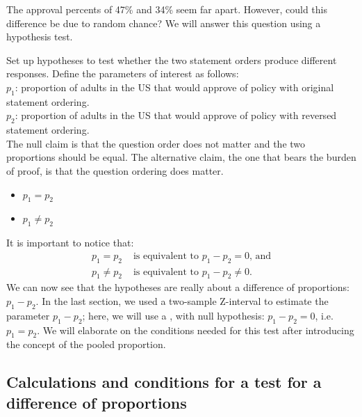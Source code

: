\D{\newpage}

\noindent The approval percents of 47\% and 34\% seem far apart.  However, could this difference be due to random chance?  We will answer this question using a hypothesis test.  

\begin{examplewrap}
\begin{nexample}{Set up hypotheses to test whether the two statement orders produce different responses. }
Define the parameters of interest as follows:\\
$p_1 $: proportion of adults in the US that would approve of policy with original statement ordering.\\
$p_2$: proportion of adults in the US that would approve of policy with reversed statement ordering.\\

The null claim is that the question order does not matter and the two proportions should be equal. The alternative claim, the one that bears the burden of proof, is that the question ordering does matter.  
\begin{itemize}
\setlength{\itemsep}{0mm}
\item[$H_0$:] $p_1 =  p_2$ 
\item[$H_A$:] $p_1 \ne  p_2$
\end{itemize}
\end{nexample}
\end{examplewrap}

\noindent%
It is important to notice that:
\vspace{-2mm}
\begin{align*}
p_1=p_2 &\text{ is equivalent to } p_1-p_2=0\text{, and} \\
p_1\ne p_2 &\text{ is equivalent to } p_1-p_2\ne 0.  
\end{align*}
We can now see that the hypotheses are really about a difference of proportions: $p_1-p_2$.  In the last section, we used a two-sample Z-interval to estimate the parameter $p_1-p_2$; here, we will use a , with null hypothesis: $p_1-p_2=0$, i.e. $p_1=p_2$.  We will elaborate on the conditions needed for this test after introducing the concept of the pooled proportion.  


\D{\newpage}

\subsection{Calculations and conditions for a test for a difference of proportions}

